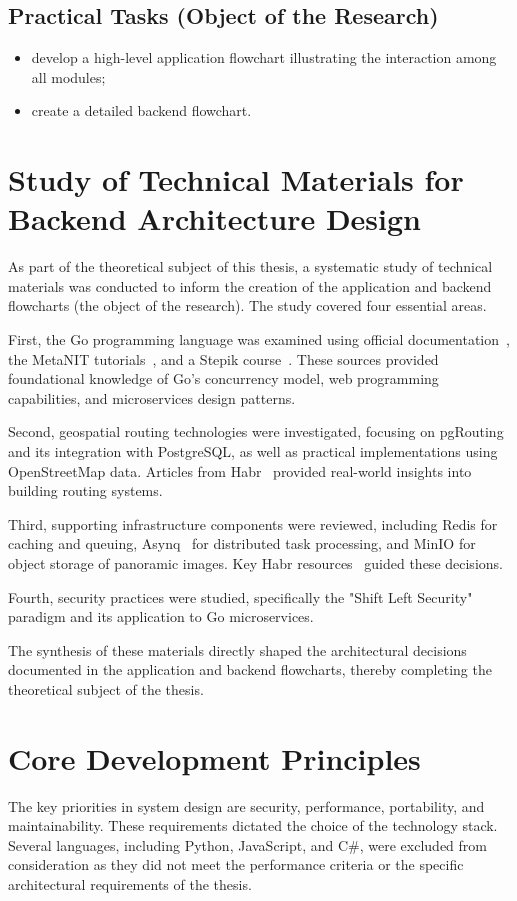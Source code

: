 \documentclass[a4paper, 14pt]{extreport}
\begin{document}
\subsection{Practical Tasks (Object of the Research)}
\begin{itemize}
	\item develop a high-level application flowchart illustrating the interaction among all modules;
	\item create a detailed backend flowchart.
\end{itemize}
\section{Study of Technical Materials for Backend Architecture Design}

As part of the theoretical subject of this thesis, a systematic study of technical materials was conducted to inform the creation of the application and backend flowcharts (the object of the research). The study covered four essential areas.

First, the Go programming language was examined using official documentation~\cite{go.dev}, the MetaNIT tutorials~\cite{metanit.go, metanit.web}, and a Stepik course~\cite{stepik.go}. These sources provided foundational knowledge of Go's concurrency model, web programming capabilities, and microservices design patterns.

Second, geospatial routing technologies were investigated, focusing on pgRouting~\cite{pgrouting.docs} and its integration with PostgreSQL, as well as practical implementations using OpenStreetMap data. Articles from Habr~\cite{habr.pgrouting} provided real-world insights into building routing systems.

Third, supporting infrastructure components were reviewed, including Redis for caching and queuing, Asynq~\cite{asynq} for distributed task processing, and MinIO for object storage of panoramic images. Key Habr resources~\cite{habr.redis, habr.minio, habr.asynq} guided these decisions.

Fourth, security practices were studied, specifically the "Shift Left Security" paradigm and its application to Go microservices.

The synthesis of these materials directly shaped the architectural decisions documented in the application and backend flowcharts, thereby completing the theoretical subject of the thesis.
\section{Core Development Principles}
The key priorities in system design are security, performance, portability, and maintainability. These requirements dictated the choice of the technology stack. Several languages, including Python, JavaScript, and C\#, were excluded from consideration as they did not meet the performance criteria or the specific architectural requirements of the thesis.
\end{document}

